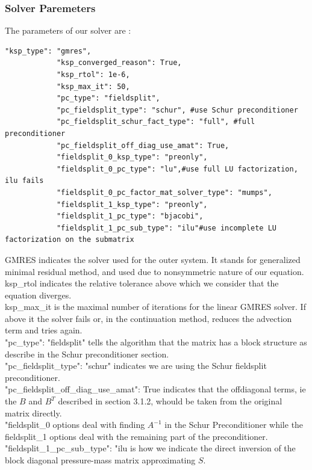 \documentclass[11pt,twoside,a4paper]{article}
\begin{document}
\subsubsection{Solver Paremeters}
The parameters of our solver are :
\begin{lstlisting}
"ksp_type": "gmres",
            "ksp_converged_reason": True,
            "ksp_rtol": 1e-6,
            "ksp_max_it": 50,
            "pc_type": "fieldsplit",
            "pc_fieldsplit_type": "schur", #use Schur preconditioner
            "pc_fieldsplit_schur_fact_type": "full", #full preconditioner
            "pc_fieldsplit_off_diag_use_amat": True,
            "fieldsplit_0_ksp_type": "preonly",
            "fieldsplit_0_pc_type": "lu",#use full LU factorization, ilu fails
            "fieldsplit_0_pc_factor_mat_solver_type": "mumps",
            "fieldsplit_1_ksp_type": "preonly",
            "fieldsplit_1_pc_type": "bjacobi",
            "fieldsplit_1_pc_sub_type": "ilu"#use incomplete LU factorization on the submatrix
\end{lstlisting}
GMRES indicates the solver used for the outer system.
 It stands for generalized minimal residual method, and used due to nonsymmetric nature of our equation.\\
ksp\_rtol indicates the relative tolerance above which we consider that the equation diverges.\\
ksp\_max\_it is the maximal number of iterations for the linear GMRES solver. If above it the solver fails or, in the continuation method, reduces the advection term and tries again.\\
"pc\_type": "fieldsplit" tells the algorithm that the matrix has a block structure as describe in the Schur preconditioner section.\\
"pc\_fieldsplit\_type": "schur" indicates we are using the Schur fieldsplit preconditioner.\\
"pc\_fieldsplit\_off\_diag\_use\_amat": True indicates that the offdiagonal terms, ie the $B$ and $B^T$ described in section 3.1.2, whould be taken from the original matrix directly. \\
"fieldsplit\_0 options deal with finding $A^{-1}$ in the Schur Preconditioner while the fieldsplit\_1 options deal with the remaining part of the preconditioner.\\
 "fieldsplit\_1\_pc\_sub\_type": "ilu is how we indicate the direct inversion of the block diagonal pressure-mass matrix approximating $S$.
\end{document}
